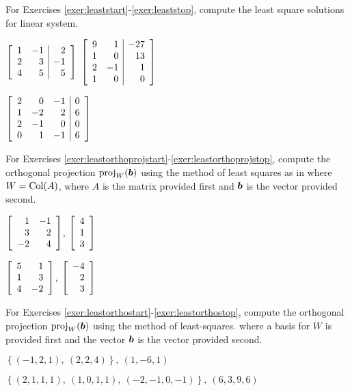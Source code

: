 
\noindent For Exercises \ref{exer:leaststart}-\ref{exer:leaststop}, compute the least square solutions for linear system.
\begin{enumerate}[!HW!, start=1, label=$\spadesuit$ \arabic*., ref=\arabic*]
\begin{multicols}{3}
\item\label{exer:leaststart} $\mtx{rr|r}{1 & -1 & 2\\ 2 & 3 & -1\\ 4 & 5 & 5}$ %
\itemspade $\mtx{rr|r}{9&1&-27\\1&0&13\\2&-1&1\\1&0&0}$ %
\item\label{exer:leaststop} $\mtx{rrr|r}{2&0&-1&0\\1&-2&2&6\\2&-1&0&0\\0&1&-1&6}$ %
\end{multicols}
\end{enumerate}

\noindent For Exercises \ref{exer:leastorthoprojstart}-\ref{exer:leastorthoprojstop}, compute the orthogonal projection $\proj_W(\bb b)$ using the method of least squares as in  where $W = \col(A)$, where $A$ is the matrix provided first and $\bb b$ is the vector provided second.
\begin{enumerate}[!HW!, label=$\spadesuit$ \arabic*., ref=\arabic*]
\begin{multicols}{2}
\item\label{exer:leastorthoprojstart} $\mtx{rr}{1&-1\\3&2\\-2&4}$, $\vr{4\\1\\3}$ %
\item\label{exer:leastorthoprojstop} $\mtx{rr}{5&1\\1&3\\4&-2}$, $\vr{-4\\2\\3}$ %
\end{multicols}
\end{enumerate}

\noindent For Exercises \ref{exer:leastorthostart}-\ref{exer:leastorthostop},  compute the orthogonal projection $\proj_W(\bb b)$ using the method of least-squares. where a basis for $W$ is provided first and the vector $\bb b$ is the vector provided second.
\begin{enumerate}[!HW!, label=$\spadesuit$ \arabic*., ref=\arabic*]
\begin{multicols}{2}
\item\label{exer:leastorthostart} $\left\{(-1,2,1),\ (2,2,4)\right\},\ (1, -6, 1)$ %
\item\label{exer:leastorthostop} $\left\{(2,1,1,1),\ (1,0,1,1),\ (-2,-1,0,-1)\right\},\ (6,3,9,6)$ %
\end{multicols}
\end{enumerate}\vs

